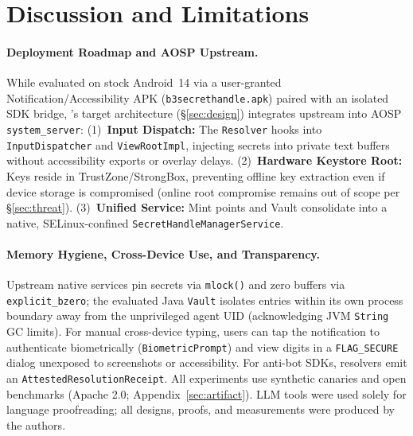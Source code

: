 \section{Discussion and Limitations}
\label{sec:discussion}

\paragraph{Deployment Roadmap and AOSP Upstream.}
While evaluated on stock Android~14 via a user-granted Notification/Accessibility APK (\texttt{b3secrethandle.apk}) paired with an isolated SDK bridge, \SH's target architecture (\S\ref{sec:design}) integrates upstream into AOSP \texttt{system\_server}: (1)~\textbf{Input Dispatch:} The \texttt{Resolver} hooks into \texttt{InputDispatcher} and \texttt{ViewRootImpl}, injecting secrets into private text buffers without accessibility exports or overlay delays. (2)~\textbf{Hardware Keystore Root:} Keys reside in TrustZone/StrongBox, preventing offline key extraction even if device storage is compromised (online root compromise remains out of scope per \S\ref{sec:threat}). (3)~\textbf{Unified Service:} Mint points and Vault consolidate into a native, SELinux-confined \texttt{SecretHandleManagerService}.

\paragraph{Memory Hygiene, Cross-Device Use, and Transparency.}
Upstream native services pin secrets via \texttt{mlock()} and zero buffers via \texttt{explicit\_bzero}; the evaluated Java \texttt{Vault} isolates entries within its own process boundary away from the unprivileged agent UID (acknowledging JVM \texttt{String} GC limits). For manual cross-device typing, users can tap the notification to authenticate biometrically (\texttt{BiometricPrompt}) and view digits in a \texttt{FLAG\_SECURE} dialog unexposed to screenshots or accessibility. For anti-bot SDKs, resolvers emit an \texttt{AttestedResolutionReceipt}. All experiments use synthetic canaries and open benchmarks (Apache 2.0; Appendix~\ref{sec:artifact}). LLM tools were used solely for language proofreading; all designs, proofs, and measurements were produced by the authors.

